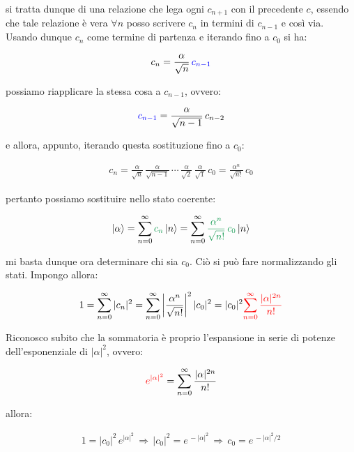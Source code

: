 	si tratta dunque di una relazione che lega ogni $c_{n+1}$ con il precedente $c$, essendo che tale relazione è vera $\forall n$ posso scrivere $c_n$ in termini di $c_{n-1}$ e così via. Usando dunque $c_n$ come termine di partenza e iterando fino a $c_0$ si ha:
	
\begin{align*}
	c_n = \frac{\alpha}{\sqrt{n}} \,\textcolor{blue}{c_{n-1}}
\end{align*}
	
	possiamo riapplicare la stessa cosa a $c_{n-1}$, ovvero:
	
\begin{align*}
	\textcolor{blue}{c_{n-1}} =  \frac{\alpha}{\sqrt{n-1}} \, c_{n-2}
\end{align*}

	e allora, appunto, iterando questa sostituzione fino a $c_0$:

\begin{align*}
	c_n = \frac{\alpha}{\sqrt{n}} \, \frac{\alpha}{\sqrt{n-1}} \, \cdots \, \frac{\alpha}{\sqrt{2}} \, \frac{\alpha}{\sqrt{1}} \, c_0 = \frac{\alpha^n}{\sqrt{n!}} \, c_0
\end{align*}
	
	pertanto possiamo sostituire nello stato coerente:
	
\begin{align*}
	\ket{\alpha} = \sum_{n = 0}^{\infty} \textcolor{ForestGreen}{c_n} \ket{n} = \sum_{n= 0}^{\infty} \textcolor{ForestGreen}{\frac{\alpha^n}{\sqrt{n!}} \, c_0} \ket{n} 
\end{align*}
	
	mi basta dunque ora determinare chi sia $c_0$. Ciò si può fare normalizzando gli stati. Impongo allora:
	
\begin{align*}
	1 = \sum_{n = 0}^{\infty} |c_n|^2 =  \sum_{n = 0}^{\infty} \abs{\frac{\alpha^n}{\sqrt{n!}}}^2 \, |c_0|^2 = |c_0|^2 \textcolor{red}{\sum_{n = 0}^{\infty} \frac{|\alpha|^{2n}}{n!}}
\end{align*}

	Riconosco subito che la sommatoria è proprio l'espansione in serie di potenze dell'esponenziale di $|\alpha|^2$, ovvero:
	
\begin{align*}
	\textcolor{red}{e^{ |\alpha|^2} } = \sum_{n = 0}^{\infty} \frac{|\alpha|^{2n}}{n!}
\end{align*}

	allora:
	
\begin{align*}
	1 = |c_0|^2 \, e^{ |\alpha|^2} \, \Rightarrow \, |c_0|^2  = e^{\, - |\alpha|^2} \, \Rightarrow \, c_0  = e^{\, - |\alpha|^2/2} 
\end{align*}

